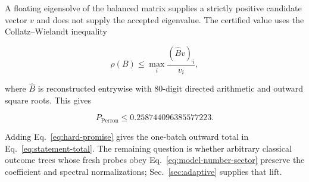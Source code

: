 A floating eigensolve of the balanced matrix supplies a strictly positive candidate vector $v$ and does not supply the accepted eigenvalue. The certified value uses the Collatz--Wielandt inequality

\begin{equation}
\rho(B)
\le
\max_i\frac{(\widehat Bv)_i}{v_i},
\label{eq:onebatch-collatz}
\end{equation}

where $\widehat B$ is reconstructed entrywise with 80-digit directed arithmetic and outward square roots. This gives

\begin{equation}
P_{\mathrm{Perron}}
\le 0.258744096385577223.
\label{eq:onebatch-perron}
\end{equation}

Adding Eq.~\eqref{eq:hard-promise} gives the one-batch outward total in Eq.~\eqref{eq:statement-total}. The remaining question is whether arbitrary classical outcome trees whose fresh probes obey Eq.~\eqref{eq:model-number-sector} preserve the coefficient and spectral normalizations; Sec.~\ref{sec:adaptive} supplies that lift.
